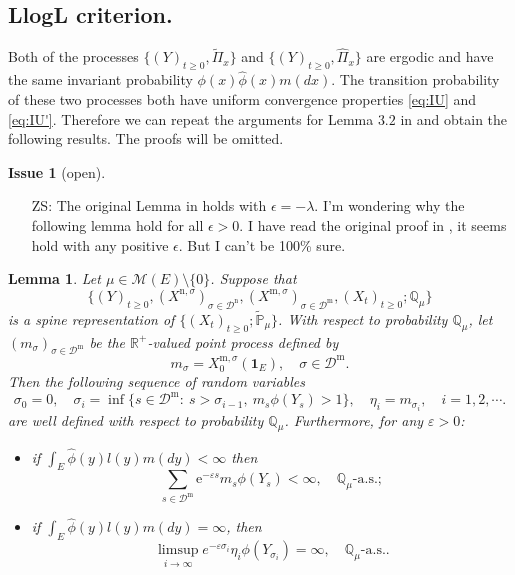 \documentclass[12pt,a4paper]{amsart}
\numberwithin{equation}{section}
\theoremstyle{plain}
\newtheorem{lem}[thm]{Lemma}
\theoremstyle{definition}
\newtheorem{iss}{Issue}
\begin{document}
\subsection{LlogL criterion.}

Both of the processes $\{(Y)_{t\geq 0}, \widetilde\Pi_x\}$ and $\{(Y)_{t\geq 0}, \widehat{\Pi}_x\}$ are ergodic and have the same invariant probability $\phi(x)\widehat\phi(x)m(dx)$.
The transition probability of these two processes both have uniform convergence properties \eqref{eq:IU} and \eqref{eq:IU'}.
Therefore we can repeat the arguments for Lemma $3.2$ in \cite{LiuRenSong2009Log} and obtain the following results.
The proofs will be omitted.

\begin{iss}[open]~
  \begin{itemize}
  \item[ZS:]
The original Lemma in \cite{LiuRenSong2009Log} holds with $\epsilon = -\lambda$. I'm wondering why the following lemma hold for all $\epsilon>0$. I have read the original proof in \cite{LiuRenSong2009Log}, it seems hold with any positive $\epsilon$. But I can't be 100\% sure. 
  \end{itemize}
\end{iss}
\begin{lem}\label{lem:import_lemma}
	Let $\mu \in \mathcal M(E)\setminus \{0\}$.
	Suppose that \[\{(Y)_{t\geq 0}, (X^{\mathrm n, \sigma})_{\sigma\in \mathcal D^\mathrm n}, (X^{\mathrm m, \sigma})_{\sigma \in \mathcal D^\mathrm m}, (X_t)_{t\geq 0}; \mathbb Q_{\mu}\}\] is a spine representation of $\{(X_t)_{t\geq 0}; \widetilde {\mathbb P}_\mu\}$.
	With respect to probability $\mathbb Q_\mu$, let $(m_\sigma)_{\sigma\in \mathcal D^{\mathrm m}}$ be the $\mathbb R^+$-valued point process defined by
  \[
  	m_\sigma = X^{\mathrm m, \sigma}_0(\mathbf 1_E),
  	\quad \sigma \in \mathcal D^{\mathrm m}.
  \]
	Then the following sequence of random variables
  \[
    \sigma_0=0,\quad \sigma_i=\inf\{s\in\mathcal D^{\mathrm m}:\ s>\sigma_{i-1},\ m_s\phi(Y_s)>1\}, \quad\eta_i=m_{\sigma_i},\quad i=1,2,\cdots.
  \]
	are well defined with respect to probability $\mathbb Q_\mu$.
	Furthermore, for any $\varepsilon>0$:
  \begin{itemize}
  \item
    if $\int_E\widehat{\phi}(y)l(y)m(dy)<\infty$ then
  \[
    \sum_{s\in\mathcal D^{\mathrm m}}\mbox{e}^{-\varepsilon s}m_s\phi(Y_s) < \infty, \quad
    \mathbb Q_{\mu}\text{-a.s.};
  \]
\item
  if $ \int_E\widehat{\phi}(y)l(y)m(dy)=\infty$, then
  \[
    \limsup_{i\rightarrow\infty}e^{-\varepsilon \sigma_i}\eta_i
    \phi(Y_{\sigma_i})=\infty,
    \quad \mathbb Q_{\mu}\text{-a.s.}.
  \]
\end{itemize}
\end{lem}
\end{document}
